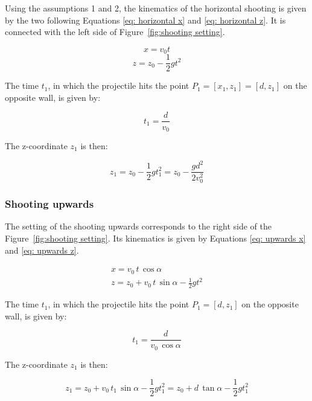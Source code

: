 			Using the assumptions 1 and 2, the kinematics of the horizontal shooting is given by the two following Equations \eqref{eq: horizontal x} and \eqref{eq: horizontal z}. It is connected with the left side of Figure~\ref{fig:shooting setting}.
		
			\begin{equation} \label{eq: horizontal x}
				x = v_0 t
			\end{equation}
			\begin{equation} \label{eq: horizontal z}
				z = z_0 - \frac{1}{2} g t^2
			\end{equation}
			
			The time $ t_1$, in which the projectile hits the point $P_1 =  [x_1, z_1] = [d, z_1]$ on the opposite wall, is given by:
			
			\begin{equation}
				t_1 = \frac{d}{v_0}
			\end{equation}
			
			The z-coordinate $ z_1$ is then:
			
			\begin{equation} \label{eq: horizontal z1}
				z_1 = z_0 - \frac{1}{2}g t_1^2 = z_0 - \frac{g d^2}{2 v_0^2}
			\end{equation}
		
		\subsubsection{Shooting upwards}
		
			The setting of the shooting upwards corresponds to the right side of the Figure~\ref{fig:shooting setting}. Its kinematics is given by Equations \eqref{eq: upwards x} and \eqref{eq: upwards z}.
			
			\begin{align}
				x = v_0 \, t \, \cos \alpha \label{eq: upwards x} \\
				z = z_0 + v_0 \, t \, \sin \alpha - \frac{1}{2}g t^2 \label{eq: upwards z}
			\end{align}
			
			The time $ t_1$, in which the projectile hits the point $P_1 =  [d, z_1]$ on the opposite wall, is given by:
			
			\begin{equation}
				t_1 = \frac{d}{v_0 \, \cos \alpha}
			\end{equation}
			
			The z-coordinate $ z_1$ is then:
			
			\begin{equation} \label{eq: upwards z1}
				z_1 = z_0 + v_0 \, t_1 \, \sin \alpha - \frac{1}{2}g t_1^2 = z_0 + d \, \tan \alpha - \frac{1}{2}g t_1^2
			\end{equation}
			

